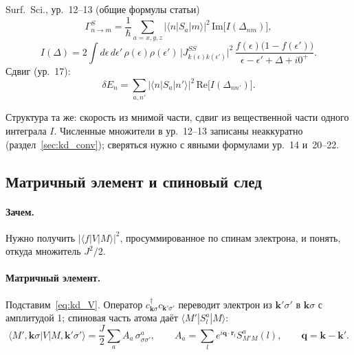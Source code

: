 \begin{paperbox}{Surf.\ Sci., ур.~12--13 (общие формулы статьи)}
\[
\Gamma^S_{n\to m}=\frac1\hbar\sum_{a=x,y,z}|\langle n|S_a|m\rangle|^2\,\mathrm{Im}\big[I(\Delta_{nm})\big],
\]
\[
I(\Delta)=2\int d\epsilon\,d\epsilon'\,\rho(\epsilon)\rho(\epsilon')\,
\big|J^{SS}_{k(\epsilon)k(\epsilon')}\big|^2\,
\frac{f(\epsilon)\big(1-f(\epsilon')\big)}{\epsilon-\epsilon'+\Delta+i0^+}.
\]
Сдвиг (ур.~17):
\[
\delta E_n=\sum_{a,n'}|\langle n|S_a|n'\rangle|^2\,\mathrm{Re}\big[I(\Delta_{nn'})\big].
\]
\end{paperbox}
\begin{cmpbox}
Структура та же: скорость из мнимой части, сдвиг из вещественной части
одного интеграла $I$. Численные множители в ур.~12--13 записаны неаккуратно
(раздел~\ref{sec:kd_conv}); сверяться нужно с явными формулами ур.~14 и~20--22.
\end{cmpbox}

\subsection{Матричный элемент и спиновый след}
\label{sec:kd_me}

\paragraph{Зачем.} Нужно получить $|\langle f|V|M\rangle|^2$, просуммированное по
спинам электрона, и понять, откуда множитель $J^2/2$.

\paragraph{Матричный элемент.} Подставим~\eqref{eq:kd_V}. Оператор
$c^\dagger_{\mathbf k\sigma}c_{\mathbf k'\sigma'}$ переводит электрон из $\mathbf k'\sigma'$ в $\mathbf k\sigma$ с
амплитудой 1; спиновая часть атома даёт $\langle M'|S^a_l|M\rangle$:
\[
\langle M',\mathbf k\sigma|V|M,\mathbf k'\sigma'\rangle
=\frac J2\sum_a A_a\,\sigma^a_{\sigma\sigma'},\qquad
A_a=\sum_le^{i\mathbf q\cdot\mathbf r_l}S^a_{M'M}(l),\qquad \mathbf q=\mathbf k-\mathbf k'.
\]

